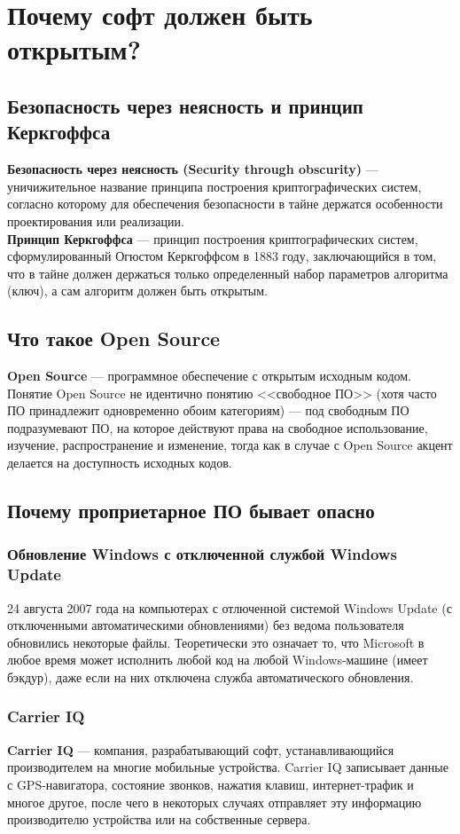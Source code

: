 \chapter{Почему софт должен быть открытым?}
\section{Безопасность через неясность и принцип Керкгоффса}
\textbf{Безопасность через неясность (Security through obscurity)} --- уничижительное название принципа построения криптографических систем, согласно которому для обеспечения безопасности в тайне держатся особенности проектирования или реализации.\\
\textbf{Принцип Керкгоффса} --- принцип построения криптографических систем, сформулированный Огюстом Керкгоффсом в 1883 году, заключающийся в том, что в тайне должен держаться только определенный набор параметров алгоритма (ключ), а сам алгоритм должен быть открытым.
\section{Что такое Open Source}
\textbf{Open Source} --- программное обеспечение с открытым исходным кодом. Понятие Open Source не идентично понятию <<свободное ПО>> (хотя часто ПО принадлежит одновременно обоим категориям)  --- под свободным ПО подразумевают ПО, на которое действуют права на свободное использование, изучение, распространение и изменение, тогда как в случае с Open Source акцент делается на доступность исходных кодов.
\section{Почему проприетарное ПО бывает опасно}
\subsection{Обновление Windows с отключенной службой Windows Update}
24 августа 2007 года на компьютерах с отлюченной системой Windows Update (с отключенными автоматическими обновлениями) без ведома пользователя обновились некоторые файлы\cite{windowsupdate}. Теоретически это означает то, что Microsoft в любое время может исполнить любой код на любой Windows-машине (имеет бэкдур), даже если на них отключена служба автоматического обновления.
\subsection{Carrier IQ}
\textbf{Carrier IQ} --- компания, разрабатывающий софт, устанавливающийся производителем на многие мобильные устройства. Carrier IQ записывает данные с GPS-навигатора, состояние звонков, нажатия клавиш, интернет-трафик и многое другое, после чего в некоторых случаях отправляет эту информацию производителю устройства или на собственные сервера\cite{carrieriq1}\cite{carrieriq2}.
